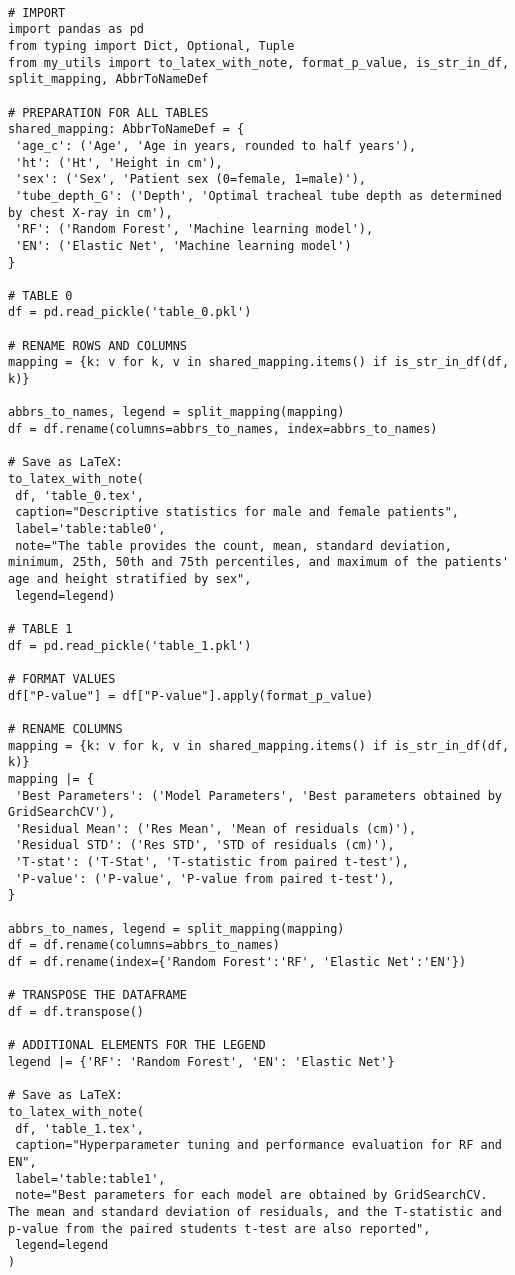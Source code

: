\documentclass[11pt]{article}
\begin{document}
\begin{verbatim}

# IMPORT
import pandas as pd
from typing import Dict, Optional, Tuple
from my_utils import to_latex_with_note, format_p_value, is_str_in_df, split_mapping, AbbrToNameDef

# PREPARATION FOR ALL TABLES
shared_mapping: AbbrToNameDef = {
 'age_c': ('Age', 'Age in years, rounded to half years'),
 'ht': ('Ht', 'Height in cm'),
 'sex': ('Sex', 'Patient sex (0=female, 1=male)'),
 'tube_depth_G': ('Depth', 'Optimal tracheal tube depth as determined by chest X-ray in cm'),
 'RF': ('Random Forest', 'Machine learning model'),
 'EN': ('Elastic Net', 'Machine learning model')
}

# TABLE 0
df = pd.read_pickle('table_0.pkl')

# RENAME ROWS AND COLUMNS
mapping = {k: v for k, v in shared_mapping.items() if is_str_in_df(df, k)} 

abbrs_to_names, legend = split_mapping(mapping)
df = df.rename(columns=abbrs_to_names, index=abbrs_to_names)

# Save as LaTeX:
to_latex_with_note(
 df, 'table_0.tex',
 caption="Descriptive statistics for male and female patients", 
 label='table:table0',
 note="The table provides the count, mean, standard deviation, minimum, 25th, 50th and 75th percentiles, and maximum of the patients' age and height stratified by sex",
 legend=legend)

# TABLE 1
df = pd.read_pickle('table_1.pkl')

# FORMAT VALUES
df["P-value"] = df["P-value"].apply(format_p_value)

# RENAME COLUMNS
mapping = {k: v for k, v in shared_mapping.items() if is_str_in_df(df, k)}
mapping |= {
 'Best Parameters': ('Model Parameters', 'Best parameters obtained by GridSearchCV'),
 'Residual Mean': ('Res Mean', 'Mean of residuals (cm)'),
 'Residual STD': ('Res STD', 'STD of residuals (cm)'),
 'T-stat': ('T-Stat', 'T-statistic from paired t-test'),
 'P-value': ('P-value', 'P-value from paired t-test'),
}

abbrs_to_names, legend = split_mapping(mapping)
df = df.rename(columns=abbrs_to_names)
df = df.rename(index={'Random Forest':'RF', 'Elastic Net':'EN'})

# TRANSPOSE THE DATAFRAME
df = df.transpose()

# ADDITIONAL ELEMENTS FOR THE LEGEND
legend |= {'RF': 'Random Forest', 'EN': 'Elastic Net'}

# Save as LaTeX:
to_latex_with_note(
 df, 'table_1.tex',
 caption="Hyperparameter tuning and performance evaluation for RF and EN", 
 label='table:table1',
 note="Best parameters for each model are obtained by GridSearchCV. The mean and standard deviation of residuals, and the T-statistic and p-value from the paired students t-test are also reported",
 legend=legend
)


\end{verbatim}
\end{document}
